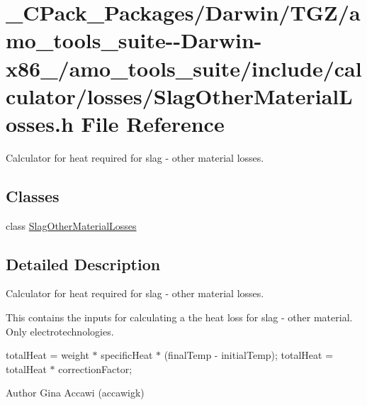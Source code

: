 \hypertarget{___c_pack___packages_2_darwin_2_t_g_z_2amo__tools__suite--_darwin-x86__64_2amo__tools__suite_2inf1f20bd99b7386714aa4f07a5c988388}{}\section{\+\_\+\+C\+Pack\+\_\+\+Packages/\+Darwin/\+T\+G\+Z/amo\+\_\+tools\+\_\+suite-\/-\/\+Darwin-\/x86\+\_/amo\+\_\+tools\+\_\+suite/include/calculator/losses/\+Slag\+Other\+Material\+Losses.h File Reference}
\label{___c_pack___packages_2_darwin_2_t_g_z_2amo__tools__suite--_darwin-x86__64_2amo__tools__suite_2inf1f20bd99b7386714aa4f07a5c988388}


Calculator for heat required for slag -\/ other material losses.  


\subsection*{Classes}
\begin{DoxyCompactItemize}
\item 
class \hyperlink{class_slag_other_material_losses}{Slag\+Other\+Material\+Losses}
\end{DoxyCompactItemize}


\subsection{Detailed Description}
Calculator for heat required for slag -\/ other material losses. 

This contains the inputs for calculating a the heat loss for slag -\/ other material. Only electrotechnologies.

total\+Heat = weight $\ast$ specific\+Heat $\ast$ (final\+Temp -\/ initial\+Temp); total\+Heat = total\+Heat $\ast$ correction\+Factor;

\begin{DoxyAuthor}{Author}
Gina Accawi (accawigk) 
\end{DoxyAuthor}
